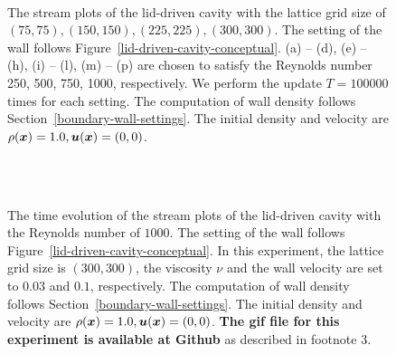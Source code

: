 \begin{figure}[t]
\begin{center}
{    }
    \\
    \caption{The stream plots of the lid-driven cavity
    with the lattice grid size of $(75, 75), (150, 150), (225, 225), (300, 300)$.
    The setting of the wall follows Figure~\ref{lid-driven-cavity-conceptual}.
    (a) -- (d), (e) -- (h), (i) -- (l), (m) -- (p) are chosen to satisfy the Reynolds number
    250, 500, 750, 1000, respectively.
    We perform the update $T = 100000$ times for each setting.
    The computation of wall density follows Section~\ref{boundary-wall-settings}.
    The initial density and velocity are $\rho(\boldsymbol{x}) = 1.0, \boldsymbol{u}(\boldsymbol{x}) = (0, 0)$.
      \label{fig:sliding-lid-reynolds-comparison}}
  \end{center}
\end{figure}

\begin{figure}[t]
  \begin{center}
    \\
    \vspace{-3mm}
    \\
    \caption{
      The time evolution of the stream plots of the lid-driven cavity
    with the Reynolds number of $1000$.
    The setting of the wall follows Figure~\ref{lid-driven-cavity-conceptual}.
    In this experiment, the lattice grid size is $(300, 300)$,
    the viscosity $\nu$ and the wall velocity are set to $0.03$ and $0.1$, respectively.
    The computation of wall density follows Section~\ref{boundary-wall-settings}.
    The initial density and velocity are $\rho(\boldsymbol{x}) = 1.0, \boldsymbol{u}(\boldsymbol{x}) = (0, 0)$.
    {\bf The gif file for this experiment is available at Github} as described in footnote 3.
    }
    \label{fig:sliding-lid-velocity-evolution}
  \end{center}
\end{figure}

